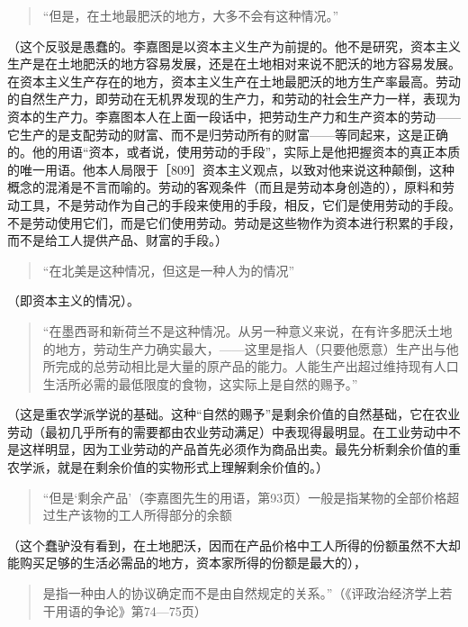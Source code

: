 \begin{quote}{“但是，在土地最肥沃的地方，大多不会有这种情况。”}\end{quote}

（这个反驳是愚蠢的。李嘉图是以资本主义生产为前提的。他不是研究，资本主义生产是在土地肥沃的地方容易发展，还是在土地相对来说不肥沃的地方容易发展。在资本主义生产存在的地方，资本主义生产在土地最肥沃的地方生产率最高。劳动的自然生产力，即劳动在无机界发现的生产力，和劳动的社会生产力一样，表现为资本的生产力。李嘉图本人在上面一段话中，把劳动生产力和生产资本的劳动——它生产的是支配劳动的财富、而不是归劳动所有的财富——等同起来，这是正确的。他的用语“资本，或者说，使用劳动的手段”，实际上是他把握资本的真正本质的唯一用语。他本人局限于［809］资本主义观点，以致对他来说这种颠倒，这种概念的混淆是不言而喻的。劳动的客观条件（而且是劳动本身创造的），原料和劳动工具，不是劳动作为自己的手段来使用的手段，相反，它们是使用劳动的手段。不是劳动使用它们，而是它们使用劳动。劳动是这些物作为资本进行积累的手段，而不是给工人提供产品、财富的手段。）

\begin{quote}{“在北美是这种情况，但这是一种人为的情况”}\end{quote}

（即资本主义的情况）。

\begin{quote}{“在墨西哥和新荷兰不是这种情况。从另一种意义来说，在有许多肥沃土地的地方，劳动生产力确实最大，——这里是指人（只要他愿意）生产出与他所完成的总劳动相比是大量的原产品的能力。人能生产出超过维持现有人口生活所必需的最低限度的食物，这实际上是自然的赐予。”}\end{quote}

（这是重农学派学说的基础。这种“自然的赐予”是剩余价值的自然基础，它在农业劳动（最初几乎所有的需要都由农业劳动满足）中表现得最明显。在工业劳动中不是这样明显，因为工业劳动的产品首先必须作为商品出卖。最先分析剩余价值的重农学派，就是在剩余价值的实物形式上理解剩余价值的。）

\begin{quote}{“但是‘剩余产品’（李嘉图先生的用语，第93页）一般是指某物的全部价格超过生产该物的工人所得部分的余额}\end{quote}

（这个蠢驴没有看到，在土地肥沃，因而在产品价格中工人所得的份额虽然不大却能购买足够的生活必需品的地方，资本家所得的份额是最大的），

\begin{quote}{是指一种由人的协议确定而不是由自然规定的关系。”（《评政治经济学上若干用语的争论》第74—75页）}\end{quote}

